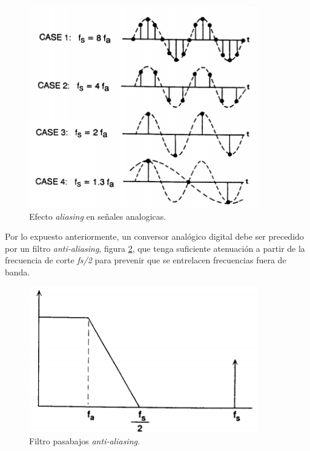 \begin{figure}[ht]
	\centering
	\includegraphics[width=100mm]{./Figures/muestreo2.png}
	\caption{Efecto \textit{aliasing} en señales analogicas.}
	\label{fig:muestreo2}
\end{figure}

Por lo expuesto anteriormente, un conversor analógico digital debe ser precedido por un filtro \textit{anti-aliasing}, figura \ref{fig:muestreo3}, que tenga suficiente atenuación a partir de la frecuencia de corte \textit{fs/2} para prevenir que se entrelacen frecuencias fuera de banda.

\begin{figure}[ht]
	\centering
	\includegraphics[width=100mm]{./Figures/muestreo3.png}
	\caption{Filtro pasabajos \textit{anti-aliasing}.}
	\label{fig:muestreo3}
\end{figure}

\newpage

